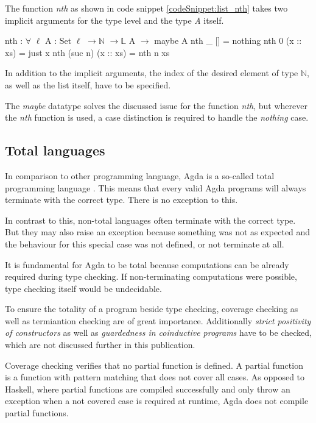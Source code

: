 The function \emph{nth} as shown in code snippet \ref{codeSnippet:list_nth} takes two implicit arguments for the type level and the type \emph{A} itself.

\begin{codesnippet}[mathescape=true, caption={Definition of nth function in Agda}, label={codeSnippet:list_nth}]
nth : $\forall$ {$\ell$} {A : Set $\ell$} $\rightarrow \mathbb{N}$ $\rightarrow \mathbb{L}$ A $\rightarrow$ maybe A
nth _ [] = nothing
nth 0 (x :: xs) = just x
nth (suc n) (x :: xs) = nth n xs
\end{codesnippet}

In addition to the implicit arguments, the index of the desired element of type $\mathbb{N}$, as well as the list itself, have to be specified.

The \emph{maybe} datatype solves the discussed issue for the function \emph{nth}, but wherever the \emph{nth} function is used, a case distinction is required to handle the \emph{nothing} case.

\subsection{Total languages}\label{section:total_languages}
In comparison to other programming language, Agda is a so-called total programming language \cite{AgdaReadTheDocs}.
This means that every valid Agda programs will always terminate with the correct type. There is no exception to this.

In contrast to this, non-total languages often terminate with the correct type. 
But they may also raise an exception because something was not as expected and the behaviour for this special case was not defined, or not terminate at all.

It is fundamental for Agda to be total because computations can be already required during type checking.
If non-terminating computations were possible, type checking itself would be undecidable\cite{agda_wiki_totality}.

To ensure the totality of a program beside type checking, coverage checking as well as termiantion checking are of great importance. 
Additionally \emph{strict positivity of constructors} as well as \emph{guardedness in coinductive programs} have to be checked, which are not discussed further in this publication.

Coverage checking verifies that no partial function is defined. A partial function is a function with pattern matching that does not cover all cases.
As opposed to Haskell, where partial functions are compiled successfully and only throw an exception when a not covered case is required at runtime, Agda does not compile partial functions.

